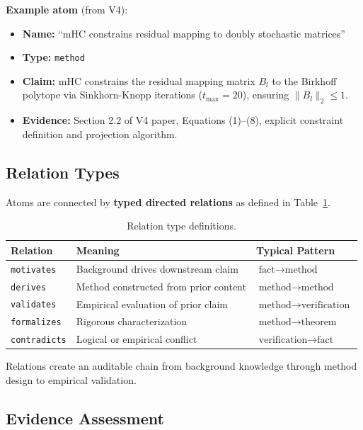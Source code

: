\documentclass[11pt,a4paper]{article}
\begin{document}
\textbf{Example atom} (from V4):
\begin{itemize}
    \item \textbf{Name:} ``mHC constrains residual mapping to doubly stochastic matrices''
    \item \textbf{Type:} \texttt{method}
    \item \textbf{Claim:} mHC constrains the residual mapping matrix $B_l$ to the Birkhoff polytope via Sinkhorn-Knopp iterations ($t_{\max}=20$), ensuring $\|B_l\|_2 \leq 1$.
    \item \textbf{Evidence:} Section 2.2 of V4 paper, Equations (1)--(8), explicit constraint definition and projection algorithm.
\end{itemize}

\subsection{Relation Types}

Atoms are connected by \textbf{typed directed relations} as defined in Table~\ref{tab:relation-types}.

\begin{table}[H]
\centering
\caption{Relation type definitions.}
\label{tab:relation-types}
\begin{tabular}{lll}
\toprule
\textbf{Relation} & \textbf{Meaning} & \textbf{Typical Pattern} \\
\midrule
\texttt{motivates} & Background drives downstream claim & $\text{fact} \to \text{method}$ \\
\texttt{derives} & Method constructed from prior content & $\text{method} \to \text{method}$ \\
\texttt{validates} & Empirical evaluation of prior claim & $\text{method} \to \text{verification}$ \\
\texttt{formalizes} & Rigorous characterization & $\text{method} \to \text{theorem}$ \\
\texttt{contradicts} & Logical or empirical conflict & $\text{verification} \to \text{fact}$ \\
\bottomrule
\end{tabular}
\end{table}

Relations create an auditable chain from background knowledge through method design to empirical validation.

\subsection{Evidence Assessment}
\end{document}
